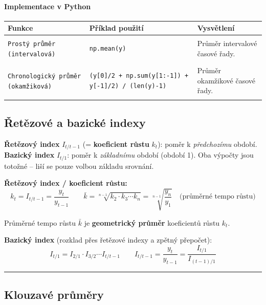\documentclass[a4paper, 11pt]{article}
\newenvironment{funkcedict}
{%
  \begingroup
  \renewcommand{\arraystretch}{1.4}%
  \lstset{basicstyle=\ttfamily\small, columns=fullflexible}%
  \setlength{\tabcolsep}{4pt}%
  \begin{tabular}{p{0.19\textwidth} p{0.38\textwidth} p{0.30\textwidth}}
  \textbf{Funkce} & \textbf{Příklad použití} & \textbf{Vysvětlení} \\
  \midrule
}
{%
  \end{tabular}%
  \endgroup
}
\begin{document}
\paragraph{Implementace v Python}\mbox{}\par

\begin{funkcedict}

	\texttt{Prostý průměr (intervalová)} &
	\begin{lstlisting}
np.mean(y)
	\end{lstlisting}
	& Průměr intervalové časové řady. \\

	\texttt{Chronologický průměr (okamžiková)} &
	\begin{lstlisting}
(y[0]/2 + np.sum(y[1:-1]) + y[-1]/2) / (len(y)-1)
	\end{lstlisting}
	& Průměr okamžikové časové řady. \\

\end{funkcedict}

\subsection{Řetězové a bazické indexy}

\textbf{Řetězový index} $I_{t/t-1}$ (= \textbf{koeficient růstu} $k_t$): poměr k \emph{předchozímu} období.
\textbf{Bazický index} $I_{t/1}$: poměr k \emph{základnímu} období (období 1).
Oba výpočty jsou totožné -- liší se pouze volbou základu srovnání.

\medskip
\noindent\textbf{Řetězový index / koeficient růstu:}
\begin{equation*}
	k_t = I_{t/t-1} = \frac{y_t}{y_{t-1}}
	\qquad
	\bar{k} = \sqrt[n-1]{k_2 \cdot k_3 \cdots k_n} = \sqrt[n-1]{\frac{y_n}{y_1}}
	\quad \text{(průměrné tempo růstu)}
\end{equation*}

\noindent Průměrné tempo růstu $\bar{k}$ je \textbf{geometrický průměr} koeficientů růstu $k_t$.
\medskip

\noindent\textbf{Bazický index} (rozklad přes řetězové indexy a zpětný přepočet):
\begin{equation*}
	I_{t/1} = I_{2/1} \cdot I_{3/2} \cdots I_{t/t-1}
	\qquad
	I_{t/t-1} = \frac{y_t}{y_{t-1}} = \frac{I_{t/1}}{I_{(t-1)/1}}
\end{equation*}

\noindent\hrule\medskip

\subsection{Klouzavé průměry}
\end{document}
